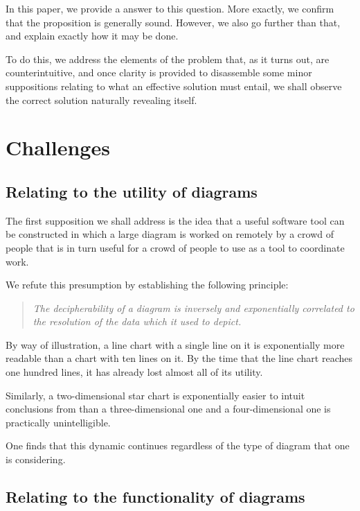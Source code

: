 \documentclass{article}
\begin{document}
In this paper, we provide a answer to this question. More exactly, we confirm that the proposition is generally sound. However, we also go further than that, and explain exactly how it may be done.

To do this, we address the elements of the problem that, as it turns out, are counterintuitive, and once clarity is provided to disassemble some  minor suppositions relating to what an effective solution must entail, we shall observe the correct solution naturally revealing itself.

\section{Challenges}

\subsection{Relating to the utility of diagrams}

The first supposition we shall address is the idea that a useful software tool can be constructed in which a large diagram is worked on remotely by a crowd of people that is in turn useful for a crowd of people to use as a tool to coordinate work.

We refute this presumption by establishing the following principle:

\begin{quote}

\textit{The decipherability of a diagram is inversely and exponentially correlated to the resolution of the data which it used to depict.
}
\end{quote}

By way of illustration, a line chart with a single line on it is exponentially more readable than a chart with ten lines on it. By the time that the line chart reaches one hundred lines, it has already lost almost all of its utility.

Similarly, a two-dimensional star chart is exponentially easier to intuit conclusions from than a three-dimensional one and a four-dimensional one is practically unintelligible.

One finds that this dynamic continues regardless of the type of diagram that one is considering.

\subsection{Relating to the functionality of diagrams}
\end{document}
